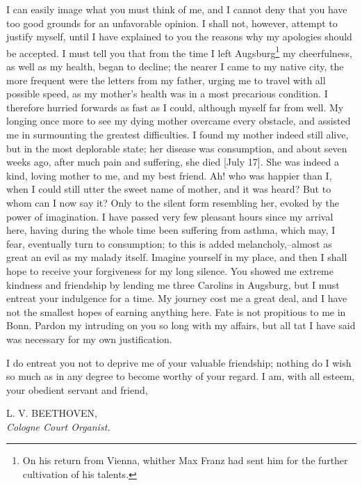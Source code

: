 \documentclass[12pt,oneside]{book}
\begin{document}
I can easily image what you must think of me, and I cannot deny that you have too good grounds for an unfavorable opinion. I shall not, however, attempt to justify myself, until I have explained to you the reasons why my apologies should be accepted. I must tell you that from the time I left Augsburg\footnote{On his return from Vienna, whither Max Franz had sent him for the further cultivation of his talents.} my cheerfulness, as well as my health, began to decline; the nearer I came to my native city, the more frequent were the letters from my father, urging me to travel with all possible speed, as my mother's health was in a most precarious condition. I therefore hurried forwards as fast as I could, although myself far from well. My longing once more to see my dying mother overcame every obstacle, and assisted me in surmounting the greatest difficulties. I found my mother indeed still alive, but in the most deplorable state; her disease was consumption, and about seven weeks ago, after much pain and suffering, she died [July 17]. She was indeed a kind, loving mother to me, and my best friend. Ah! who was happier than I, when I could still utter the sweet name of mother, and it was heard? But to whom can I now say it? Only to the silent form resembling her, evoked by the power of imagination. I have passed very few pleasant hours since my arrival here, having during the whole time been suffering from asthma, which may, I fear, eventually turn to consumption; to this is added melancholy,--almost as great an evil as my malady itself. Imagine yourself in my place, and then I shall hope to receive your forgiveness for my long silence. You showed me extreme kindness and friendship by lending me three Carolins in Augsburg, but I must entreat your indulgence for a time. My journey cost me a great deal, and I have not the smallest hopes of earning anything here. Fate is not propitious to me in Bonn. Pardon my intruding on you so long with my affairs, but all tat I have said was necessary for my own justification. \par 

I do entreat you not to deprive me of your valuable friendship; nothing do I wish so much as in any degree to become worthy of your regard. I am, with all esteem, your obedient servant and friend, 
\begin{flushright}
    L. V. BEETHOVEN,\\
    \textit{Cologne Court Organist.}
\end{flushright} \par 
\end{document}
